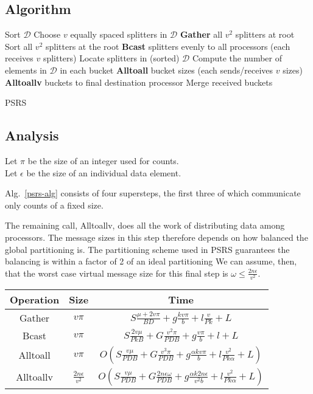 \documentclass[12pt]{carletoncsthesis}
\begin{document}
\subsection{Algorithm}


\begin{algorithm}[ht]
\BlankLine
Sort $\mathcal{D}$\;
Choose $v$ equally spaced splitters in $\mathcal{D}$\;
{\bf Gather} all $v^2$ splitters at root\;
Sort all $v^2$ splitters at the root\;
{\bf Bcast} splitters evenly to all processors (each receives $v$ splitters)\;
Locate splitters in (sorted) $\mathcal{D}$\;
Compute the number of elements in $\mathcal{D}$ in each bucket\;
{\bf Alltoall} bucket sizes (each sends/receives $v$ sizes)\;
{\bf Alltoallv} buckets to final destination processor\;
Merge received buckets\;
\caption{\sc PSRS}
\label{psrs-alg}
\end{algorithm}


\subsection{Analysis}


Let $\pi$ be the size of an integer used for counts.\\
Let $\epsilon$ be the size of an individual data element.

Alg.~\ref{psrs-alg} consists of four supersteps, the first three of which
communicate only counts of a fixed size.

The remaining call, Alltoallv, does all the work of distributing data among
processors.  The message sizes in this step therefore depends on how balanced
the global partitioning is.  The partitioning scheme used in PSRS guarantees
the balancing is within a factor of 2 of an ideal partitioning \cite{psrs}
We can assume, then, that the worst case virtual message size for this final
step is $\omega \le \frac{2n\epsilon}{v^2}$.

\begin{center}
\begin{tabular}[ht]{ccc}
Operation & Size & Time \\ \hline
Gather    & $v\pi$ &
	$S\frac{\mu + 2v\pi}{BD} + g\frac{kv\pi}{b} + l\frac{v}{Pk} + L$ \\
Bcast     & $v\pi$ &
	$S\frac{2v\mu}{PkB} + G\frac{v^2\pi}{PDB} + g\frac{v\pi}{b} + l + L$ \\
Alltoall & $v\pi$ &
	$ O\left(S\frac{v\mu}{PDB}
	+ G\frac{v^3\pi}{PDB}
	+ g\frac{\alpha{k}v\pi}{b} + l\frac{v^2}{Pk\alpha} + L\right)$ \\
Alltoallv  & $\frac{2n\epsilon}{v^2}$ &
	$O\left(S\frac{v\mu}{PDB}
	+ G\frac{2n\epsilon\omega}{PDB}
	+ g\frac{\alpha{k}2n\epsilon}{v^2b} + l\frac{v^2}{Pk\alpha} + L\right)$ \\
\end{tabular}
\end{center}
\end{document}
